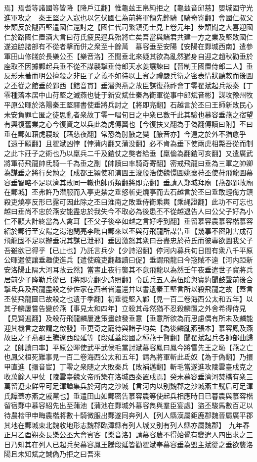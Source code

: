 焉】焉耆等諸國等皆降【降戶江翻】惟龜兹王帛純拒之【龜兹音邱慈】嬰城固守光進軍攻之　秦王堅之入寇也以乞伏國仁為前將軍領先鋒騎【騎奇寄翻】會國仁叔父步頹反於隴西堅遣國仁還討之【國仁代司繁鎮勇士見上卷元年】步頹聞之大喜迎國仁於路國仁置酒大言曰苻氏疲民逞兵殆將亡矣吾當與諸君共建一方之業及堅敗國仁遂迫脇諸部有不從者撃而併之衆至十餘萬　慕容垂至安陽【安陽在鄴城西南】遣參軍田山修牋於長樂公丕【樂音洛】丕聞垂北來疑其欲為亂然猶身自迎之趙秋勸垂於座取丕因據鄴起兵垂不從丕謀襲撃垂侍郎天水姜讓諫曰【晉制王國置侍郎二人】垂反形未著而明公擅殺之非臣子之義不如待以上賓之禮嚴兵衛之密表情狀聽敕而後圖之丕從之館垂於鄴西【館音貫】垂潜與燕之故臣謀復燕祚會丁零翟斌起兵叛秦【丁零種落本居中山苻堅之滅燕也徙于新安斌仕秦為衛軍從事中郎斌音彬】謀攻豫州牧平原公暉於洛陽秦王堅驛書使垂將兵討之【將即亮翻】石越言於丕曰王師新敗民心未安負罪亡匿之徒思亂者衆故丁零一唱旬日之中衆已數千此其驗也慕容垂燕之宿望有興復舊業之心今復資之以兵此為虎傅翼也【今復扶又翻為于偽翻傅讀曰附】丕曰垂在鄴如藉虎寢蛟【藉慈夜翻】常恐為肘腋之變【腋音亦】今遠之於外不猶愈乎【遠于願翻】且翟斌凶悖【悖蒲内翻又蒲没翻】必不肯為垂下使兩虎相斃吾從而制之此卞莊子之術也乃以羸兵二千及鎧仗之獘者給垂【羸倫為翻鎧可亥翻】又遣廣武將軍苻飛龍帥氐騎一千為垂之副【帥讀曰率騎奇寄翻】密戒飛龍曰垂為三軍之帥卿為謀垂之將行矣勉之【成都王潁使和演圖王浚殷浩使魏憬圖姚襄苻丕使苻飛龍圖慕容垂智略不足以濟其敗同一轍也帥所類翻將即亮翻】垂請入鄴城拜廟【燕都鄴故廟在鄴城】丕弗許乃潜服而入亭吏禁之垂怒斬吏燒亭而去石越言於丕曰垂敢輕侮方鎮殺吏燒亭反形已露可因此除之丕曰淮南之敗垂侍衛乘輿【乘䋲證翻】此功不可忘也越曰垂尚不忠於燕安能盡忠於我失今不取必為後患丕不從越退告人曰公父子好為小仁不顧大計終當為人禽耳【丕父子後卒如越之言好呼到翻】垂留慕容農慕容楷慕容紹於鄴行至安陽之湯池閔亮李毗自鄴來以丕與苻飛龍所謀告垂【幾事不密則害成苻飛龍固不足以辦垂况其謀已泄邪】垂因激怒其衆曰吾盡忠於苻氏而彼專欲圖我父子吾雖欲已得乎【已止也】乃託言兵少【少詩沼翻】停河内募兵旬日間有衆八千平原公暉遣使讓垂趣使進兵【遣使疏吏翻趣讀曰促】垂謂飛龍曰今宼賊不遠【河内距新安洛陽止隔大河耳故云然】當晝止夜行襲其不意飛龍以為然壬午夜垂遣世子寶將兵居前少子隆勒兵從已【將即亮翻少詩照翻】令氐兵五人為伍隂與寶約聞鼓聲前後合撃氐兵及飛龍盡殺之參佐家在西者皆遣還并以書遺秦王堅言所以殺飛龍之故【蓋言丕使飛龍圖已故殺之也遺于季翻】初垂從堅入鄴【見一百二卷海西公太和五年】以其子麟屢嘗告變於燕【事見太和四年】立殺其母然猶不忍殺麟置之外舍希得侍見【見賢遍翻】及殺苻飛龍麟屢進策畫啟發垂意【垂意所欲為而思慮偶有所未及麟能迎其機言之故謂之啟發】垂更奇之寵待與諸子均矣【為後麟亂燕張本】慕容鳳及燕故臣之子燕郡王騰遼西段延等【段延蓋段國之種燕于賢翻】聞翟斌起兵各帥部曲歸之【帥讀曰率】平原公暉使武平武侯毛當討斌慕容鳳曰鳳今將雪先王之恥【燕之亡也鳳父桓死難事見一百二卷海西公太和五年】請為將軍斬此氐奴【為于偽翻】乃擐甲直進【擐音宦】丁零之衆随之大敗秦兵【敗補邁翻】斬毛當遂進攻陵雲臺戍克之收萬餘人甲仗【陵雲臺魏文帝所築在洛城西秦置戍焉】癸未慕容垂濟河焚橋有衆三萬留遼東鮮卑可足渾譚集兵於河内之沙城【言河内以别魏郡之沙城燕主皝后可足渾氏譚蓋亦燕之戚黨也】垂遣田山如鄴密告慕容農等使起兵相應時日已暮農與慕容楷留宿鄴中慕容紹先出至蒲池【蒲池在鄴城外慕容雋與羣臣宴處】盜丕駿馬數百疋以待農楷甲申晦農楷將數十騎微服出鄴遂同奔列人【列人縣漢屬鉅鹿郡魏晉屬廣平郡其地在鄴城東北魏收地形志魏郡臨漳縣有列人城又别有列人縣亦屬魏郡】　九年春正月乙酉朔秦長樂公丕大會賓客【樂音洛】請慕容農不得始覺有變遣人四出求之三日乃知其在列人已起兵矣慕容鳳王騰段延皆勸翟斌奉慕容垂為盟主斌從之垂欲襲洛陽且未知斌之誠偽乃拒之曰吾來